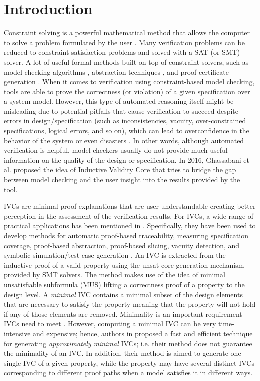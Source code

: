 \section{Introduction}
\label{sec:intro}
Constraint solving is a powerful mathematical method that allows the computer to 
solve a problem formulated by the user \cite{freuder1997pursuit}. Many verification problems can be reduced to constraint satisfaction problems and solved with a SAT (or SMT) solver.
A lot of useful formal methods built on top of
constraint solvers, such as model checking algorithms \cite{Een2011:PDR, SheeranSS00, mcmillan2003interpolation}, abstraction techniques \cite{mcmillan2003automatic, gupta2003iterative}, and proof-certificate generation \cite{ivrii2014small, piskac2016}. 
When it comes to verification using
constraint-based model checking, tools are able to prove 
the correctness (or violation) of a given specification over a system model. 
However, this type of automated reasoning itself might be misleading due to potential pitfalls that 
cause verification to succeed despite errors in 
design/specification (such as inconsistencies, vacuity, over-constrained specifications,
logical errors, and so on), which  can  lead  to  overconfidence in
the behavior of the system or even disasters \cite{Ghass16}. 
In other words, although automated verification is helpful,
 model checkers usually do not provide much useful information on the quality of the design or specification. In 2016, Ghassabani et al.
proposed the idea of Inductive Validity Core \cite{Ghass16} that tries to 
bridge the gap between model checking and the user insight into the results provided by the tool. 

IVCs are minimal proof explanations 
that are user-understandable creating better perception in the assessment of the verification results. 
For IVCs, a  wide
range of practical applications has been mentioned in \cite{Ghass16}. Specifically, they have been used to develop methods for
automatic proof-based traceability,
measuring specification coverage, 
proof-based abstraction, proof-based slicing, vacuity detection, and symbolic simulation/test case generation \cite{Ghass16, Murugesan16:renext, Ghass17Cov}. An IVC is extracted from the inductive proof of a valid property using the unsat-core generation mechanism provided by SMT solvers.
The method makes use of the idea of minimal unsatisfiable subformula (MUS) 
lifting a correctness proof of a property to the design level.
A \emph{minimal} IVC contains a minimal subset of the design elements that are
necessary to satisfy the property meaning that the 
property will not hold if any of those elements are removed. 
Minimality is an important requirement IVCs need to meet \cite{Ghass16}. 
However, computing a minimal IVC can be very time-intensive and expensive; hence, authors in \cite{Ghass16} proposed a
fast and efficient technique for generating \emph{approximately minimal} IVCs; i.e. their method 
does not guarantee the minimality of an IVC. In addition, their method is aimed to generate one single IVC of a given property, while the property may have several distinct IVCs corresponding to different proof paths when a model satisfies it in different ways. 

